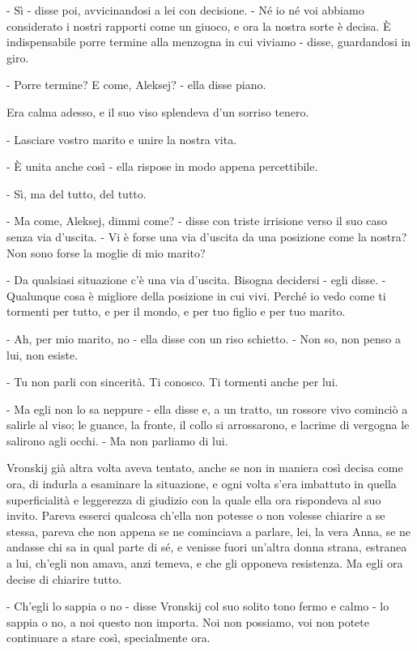 - Sì - disse poi, avvicinandosi a lei con decisione. - Né io né voi abbiamo considerato i nostri rapporti come un giuoco, e ora la nostra sorte è decisa. È indispensabile porre termine alla menzogna in cui viviamo - disse, guardandosi in giro. 

- Porre termine? E come, Aleksej? - ella disse piano. 

Era calma adesso, e il suo viso splendeva d'un sorriso tenero. 

- Lasciare vostro marito e unire la nostra vita. 

- È unita anche così - ella rispose in modo appena percettibile. 

- Sì, ma del tutto, del tutto. 

- Ma come, Aleksej, dimmi come? - disse con triste irrisione verso il suo caso senza via d'uscita. - Vi è forse una via d'uscita da una posizione come la nostra? Non sono forse la moglie di mio marito? 

- Da qualsiasi situazione c'è una via d'uscita. Bisogna decidersi - egli disse. - Qualunque cosa è migliore della posizione in cui vivi. Perché io vedo come ti tormenti per tutto, e per il mondo, e per tuo figlio e per tuo marito. 

- Ah, per mio marito, no - ella disse con un riso schietto. - Non so, non penso a lui, non esiste. 

- Tu non parli con sincerità. Ti conosco. Ti tormenti anche per lui. 

- Ma egli non lo sa neppure - ella disse e, a un tratto, un rossore vivo cominciò a salirle al viso; le guance, la fronte, il collo si arrossarono, e lacrime di vergogna le salirono agli occhi. - Ma non parliamo di lui. 

\label{xxiii-1} 

Vronskij già altra volta aveva tentato, anche se non in maniera così decisa come ora, di indurla a esaminare la situazione, e ogni volta s'era imbattuto in quella superficialità e leggerezza di giudizio con la quale ella ora rispondeva al suo invito. Pareva esserci qualcosa ch'ella non potesse o non volesse chiarire a se stessa, pareva che non appena se ne cominciava a parlare, lei, la vera Anna, se ne andasse chi sa in qual parte di sé, e venisse fuori un'altra donna strana, estranea a lui, ch'egli non amava, anzi temeva, e che gli opponeva resistenza. Ma egli ora decise di chiarire tutto. 

- Ch'egli lo sappia o no - disse Vronskij col suo solito tono fermo e calmo - lo sappia o no, a noi questo non importa. Noi non possiamo, voi non potete continuare a stare così, specialmente ora. 


